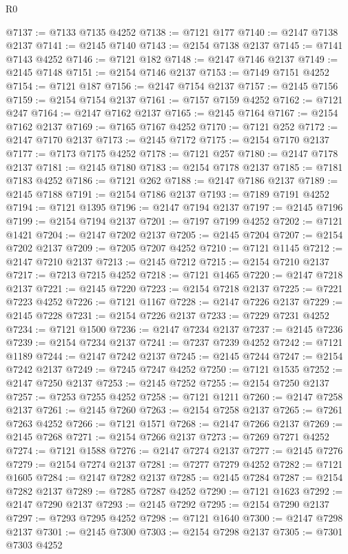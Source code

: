\begin{lexlean}{R0}
\begin{coremodule}
@7137 := @7133 @7135 @4252
@7138 := @7121 @177
@7140 := @2147 @7138 @2137
@7141 := @2145 @7140
@7143 := @2154 @7138 @2137
@7145 := @7141 @7143 @4252
@7146 := @7121 @182
@7148 := @2147 @7146 @2137
@7149 := @2145 @7148
@7151 := @2154 @7146 @2137
@7153 := @7149 @7151 @4252
@7154 := @7121 @187
@7156 := @2147 @7154 @2137
@7157 := @2145 @7156
@7159 := @2154 @7154 @2137
@7161 := @7157 @7159 @4252
@7162 := @7121 @247
@7164 := @2147 @7162 @2137
@7165 := @2145 @7164
@7167 := @2154 @7162 @2137
@7169 := @7165 @7167 @4252
@7170 := @7121 @252
@7172 := @2147 @7170 @2137
@7173 := @2145 @7172
@7175 := @2154 @7170 @2137
@7177 := @7173 @7175 @4252
@7178 := @7121 @257
@7180 := @2147 @7178 @2137
@7181 := @2145 @7180
@7183 := @2154 @7178 @2137
@7185 := @7181 @7183 @4252
@7186 := @7121 @262
@7188 := @2147 @7186 @2137
@7189 := @2145 @7188
@7191 := @2154 @7186 @2137
@7193 := @7189 @7191 @4252
@7194 := @7121 @1395
@7196 := @2147 @7194 @2137
@7197 := @2145 @7196
@7199 := @2154 @7194 @2137
@7201 := @7197 @7199 @4252
@7202 := @7121 @1421
@7204 := @2147 @7202 @2137
@7205 := @2145 @7204
@7207 := @2154 @7202 @2137
@7209 := @7205 @7207 @4252
@7210 := @7121 @1145
@7212 := @2147 @7210 @2137
@7213 := @2145 @7212
@7215 := @2154 @7210 @2137
@7217 := @7213 @7215 @4252
@7218 := @7121 @1465
@7220 := @2147 @7218 @2137
@7221 := @2145 @7220
@7223 := @2154 @7218 @2137
@7225 := @7221 @7223 @4252
@7226 := @7121 @1167
@7228 := @2147 @7226 @2137
@7229 := @2145 @7228
@7231 := @2154 @7226 @2137
@7233 := @7229 @7231 @4252
@7234 := @7121 @1500
@7236 := @2147 @7234 @2137
@7237 := @2145 @7236
@7239 := @2154 @7234 @2137
@7241 := @7237 @7239 @4252
@7242 := @7121 @1189
@7244 := @2147 @7242 @2137
@7245 := @2145 @7244
@7247 := @2154 @7242 @2137
@7249 := @7245 @7247 @4252
@7250 := @7121 @1535
@7252 := @2147 @7250 @2137
@7253 := @2145 @7252
@7255 := @2154 @7250 @2137
@7257 := @7253 @7255 @4252
@7258 := @7121 @1211
@7260 := @2147 @7258 @2137
@7261 := @2145 @7260
@7263 := @2154 @7258 @2137
@7265 := @7261 @7263 @4252
@7266 := @7121 @1571
@7268 := @2147 @7266 @2137
@7269 := @2145 @7268
@7271 := @2154 @7266 @2137
@7273 := @7269 @7271 @4252
@7274 := @7121 @1588
@7276 := @2147 @7274 @2137
@7277 := @2145 @7276
@7279 := @2154 @7274 @2137
@7281 := @7277 @7279 @4252
@7282 := @7121 @1605
@7284 := @2147 @7282 @2137
@7285 := @2145 @7284
@7287 := @2154 @7282 @2137
@7289 := @7285 @7287 @4252
@7290 := @7121 @1623
@7292 := @2147 @7290 @2137
@7293 := @2145 @7292
@7295 := @2154 @7290 @2137
@7297 := @7293 @7295 @4252
@7298 := @7121 @1640
@7300 := @2147 @7298 @2137
@7301 := @2145 @7300
@7303 := @2154 @7298 @2137
@7305 := @7301 @7303 @4252

\end{coremodule}
\end{lexlean}
